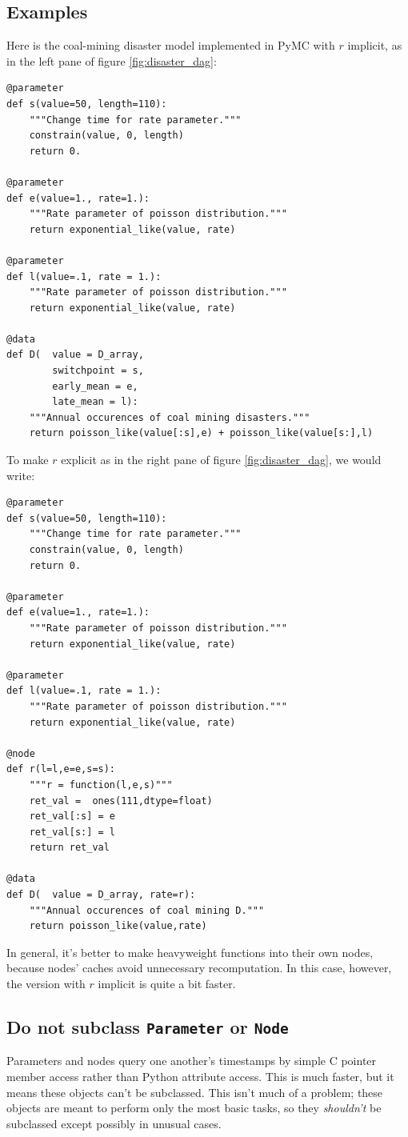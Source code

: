 \documentclass[]{book}
\begin{document}
\subsection{Examples}\label{sub:example}
Here is the coal-mining disaster model implemented in PyMC with $r$ implicit, as in the left pane of figure \ref{fig:disaster_dag}:
\begin{verbatim}
@parameter
def s(value=50, length=110):
    """Change time for rate parameter."""
    constrain(value, 0, length)
    return 0.

@parameter
def e(value=1., rate=1.):
    """Rate parameter of poisson distribution."""
    return exponential_like(value, rate)

@parameter
def l(value=.1, rate = 1.):
    """Rate parameter of poisson distribution."""
    return exponential_like(value, rate)

@data
def D(  value = D_array,
        switchpoint = s,
        early_mean = e,
        late_mean = l):
    """Annual occurences of coal mining disasters."""
    return poisson_like(value[:s],e) + poisson_like(value[s:],l)
\end{verbatim}
To make $r$ explicit as in the right pane of figure \ref{fig:disaster_dag}, we would write:
\begin{verbatim}
@parameter
def s(value=50, length=110):
    """Change time for rate parameter."""
    constrain(value, 0, length)
    return 0.

@parameter
def e(value=1., rate=1.):
    """Rate parameter of poisson distribution."""
    return exponential_like(value, rate)

@parameter
def l(value=.1, rate = 1.):
    """Rate parameter of poisson distribution."""
    return exponential_like(value, rate)

@node
def r(l=l,e=e,s=s):
    """r = function(l,e,s)"""
    ret_val =  ones(111,dtype=float)
    ret_val[:s] = e
    ret_val[s:] = l
    return ret_val

@data
def D(  value = D_array, rate=r):
    """Annual occurences of coal mining D."""
    return poisson_like(value,rate)
\end{verbatim}
In general, it's better to make heavyweight functions into their own nodes, because nodes' caches avoid unnecessary recomputation. In this case, however, the version with $r$ implicit is quite a bit faster.


\subsection{Do not subclass \texttt{Parameter} or \texttt{Node}}\label{notsubclass}
Parameters and nodes query one another's timestamps by simple C pointer member access rather than Python attribute access. This is much faster, but it means these objects can't be subclassed. This isn't much of a problem; these objects are meant to perform only the most basic tasks, so they \emph{shouldn't} be subclassed except possibly in unusual cases.
\end{document}
